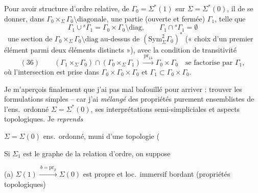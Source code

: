 \documentclass[11pt,a4paper]{article}
\begin{document}
Pour avoir   structure d'ordre  relative, de \struck{\ill{}} $\Gamma_0=\Sigma^{*}(1)$ sur $\Sigma=\Sigma^{*}(0)$, il   de se donner,  dans $\Gamma_0\times_\Sigma\Gamma_0\setminus\text{diagonale}$, une partie (ouverte et fermée) $\Gamma_1$, telle que
\[
\Gamma_1\cup{}^{s}\Gamma_1=\Gamma_0\times\Gamma_0\setminus\mathrm{diag},\qquad \Gamma_1\cap{}^{s}\Gamma_1=\emptyset
\]
\ une section de $\Gamma_0\times_\Sigma\Gamma_0\setminus\mathrm{diag}$ au-dessus de $(\mathrm{Sym}^2_\Sigma\Gamma_0)^{*}$ (« choix d'un premier élément parmi deux éléments distincts »), avec la condition de transitivité
\[
(36)\qquad (\Gamma_1\times_\Sigma\Gamma_0)\cap(\Gamma_0\times_\Sigma\Gamma_1)\xrightarrow{\ \mathrm{pr}_{13}\ }\Gamma_0\times\Gamma_0\quad\text{se factorise par }\Gamma_1,
\]
où l'intersection est prise dans $\Gamma_0\times\Gamma_0\times\Gamma_0$ et $\Gamma_1\subset\Gamma_0\times\Gamma_0$.



Je m'aperçois finalement que j'ai pas mal bafouillé pour arriver : trouver les formulations simples -- car j'ai \emph{mélangé} des propriétés purement ensemblistes de l'ens.\ ordonné $\Sigma=\Sigma^{*}(0)$, \struck{\ill{}} ses interprétations semi-simpliciales et \struck{\ill{}}  aspects topologiques. Je \emph{reprends}


$\Sigma=\Sigma(0)$ ens.\ ordonné, muni d'une topologie  ( \ill{}

Si $\Sigma_1$ est le graphe de la relation d'ordre, on suppose

(a) $\Sigma(1)\xrightarrow{\ b=\mathrm{pr}_2\ }\Sigma(0)$ est propre et loc.\ immersif bordant (propriétés topologiques) \struck{\ill{}}
\end{document}
